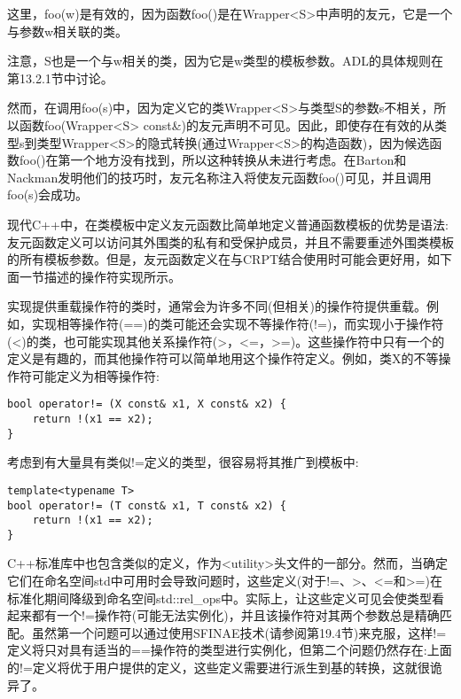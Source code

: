 这里，foo(w)是有效的，因为函数foo()是在Wrapper<S>中声明的友元，它是一个与参数w相关联的类。

\begin{tcolorbox}[colback=webgreen!5!white,colframe=webgreen!75!black]
\hspace*{0.75cm}注意，S也是一个与w相关的类，因为它是w类型的模板参数。ADL的具体规则在第13.2.1节中讨论。
\end{tcolorbox}

然而，在调用foo(s)中，因为定义它的类Wrapper<S>与类型S的参数s不相关，所以函数foo(Wrapper<S> const\&)的友元声明不可见。因此，即使存在有效的从类型s到类型Wrapper<S>的隐式转换(通过Wrapper<S>的构造函数)，因为候选函数foo()在第一个地方没有找到，所以这种转换从未进行考虑。在Barton和Nackman发明他们的技巧时，友元名称注入将使友元函数foo()可见，并且调用foo(s)会成功。

现代C++中，在类模板中定义友元函数比简单地定义普通函数模板的优势是语法:友元函数定义可以访问其外围类的私有和受保护成员，并且不需要重述外围类模板的所有模板参数。但是，友元函数定义在与CRPT结合使用时可能会更好用，如下面一节描述的操作符实现所示。


实现提供重载操作符的类时，通常会为许多不同(但相关)的操作符提供重载。例如，实现相等操作符(==)的类可能还会实现不等操作符(!=)，而实现小于操作符(<)的类，也可能实现其他关系操作符(>，<=，>=)。这些操作符中只有一个的定义是有趣的，而其他操作符可以简单地用这个操作符定义。例如，类X的不等操作符可能定义为相等操作符:

\begin{lstlisting}[style=styleCXX]
bool operator!= (X const& x1, X const& x2) {
	return !(x1 == x2);
}
\end{lstlisting}

考虑到有大量具有类似!=定义的类型，很容易将其推广到模板中:

\begin{lstlisting}[style=styleCXX]
template<typename T>
bool operator!= (T const& x1, T const& x2) {
	return !(x1 == x2);
}
\end{lstlisting}

C++标准库中也包含类似的定义，作为<utility>头文件的一部分。然而，当确定它们在命名空间std中可用时会导致问题时，这些定义(对于!=、>、<=和>=)在标准化期间降级到命名空间std::rel\_ops中。实际上，让这些定义可见会使类型看起来都有一个!=操作符(可能无法实例化)，并且该操作符对其两个参数总是精确匹配。虽然第一个问题可以通过使用SFINAE技术(请参阅第19.4节)来克服，这样!=定义将只对具有适当的==操作符的类型进行实例化，但第二个问题仍然存在:上面的!=定义将优于用户提供的定义，这些定义需要进行派生到基的转换，这就很诡异了。

